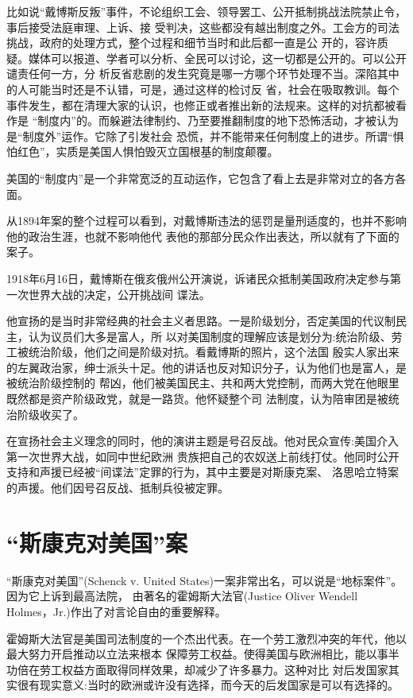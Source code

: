 \documentclass[10pt]{article}
\begin{document}
{比如说``戴博斯反叛''事件，不论组织工会、领导罢工、公开抵制挑战法院禁止令，事后接受法庭审理、上诉、接
受判决，这些都没有越出制度之外。工会方的司法挑战，政府的处理方式，整个过程和细节当时和此后都一直是公
开的，容许质疑。媒体可以报道、学者可以分析、全民可以讨论，这一切都是公开的。可以公开谴责任何一方，分
析反省悲剧的发生究竟是哪一方哪个环节处理不当。深陷其中的人可能当时还是不认错，可是，通过这样的检讨反
省，社会在吸取教训。每个事件发生，都在清理大家的认识，也修正或者推出新的法规来。这样的对抗都被看作是
``制度内''的。而躲避法律制约、乃至要推翻制度的地下恐怖活动，才被认为是``制度外''运作。它除了引发社会
恐慌，并不能带来任何制度上的进步。所谓``惧怕红色''，实质是美国人惧怕毁灭立国根基的制度颠覆。

美国的``制度内''是一个非常宽泛的互动运作，它包含了看上去是非常对立的各方各面。

从1894年案的整个过程可以看到，对戴博斯违法的惩罚是量刑适度的，也并不影响他的政治生涯，也就不影响他代
表他的那部分民众作出表达，所以就有了下面的案子。

1918年6月16日，戴博斯在俄亥俄州公开演说，诉诸民众抵制美国政府决定参与第一次世界大战的决定，公开挑战间
谍法。

他宣扬的是当时非常经典的社会主义者思路。一是阶级划分，否定美国的代议制民主，认为议员们大多是富人，所
以对美国制度的理解应该是划分为:统治阶级、劳工被统治阶级，他们之间是阶级对抗。看戴博斯的照片，这个法国
殷实人家出来的左翼政治家，绅士派头十足。他的讲话也反对知识分子，认为他们也是富人，是被统治阶级控制的
帮凶，他们被美国民主、共和两大党控制，而两大党在他眼里既然都是资产阶级政党，就是一路货。他怀疑整个司
法制度，认为陪审团是被统治阶级收买了。

在宣扬社会主义理念的同时，他的演讲主题是号召反战。他对民众宣传:美国介入第一次世界大战，如同中世纪欧洲
贵族把自己的农奴送上前线打仗。他同时公开支持和声援已经被``间谍法''定罪的行为，其中主要是对斯康克案、
洛思\textperiodcentered 哈立特案的声援。他们因号召反战、抵制兵役被定罪。

\pagebreak
\section{``斯康克对美国''案}

``斯康克对美国''(Schenck v. United States)一案非常出名，可以说是``地标案件''。因为它上诉到最高法院，
由著名的霍姆斯大法官(Justice Oliver Wendell Holmes，Jr.)作出了对言论自由的重要解释。

霍姆斯大法官是美国司法制度的一个杰出代表。在一个劳工激烈冲突的年代，他以最大努力开启推动以立法来根本
保障劳工权益。使得美国与欧洲相比，能以事半功倍在劳工权益方面取得同样效果，却减少了许多暴力。这种对比
対后发国家其实很有现实意义:当时的欧洲或许没有选择，而今天的后发国家是可以有选择的。

}
\end{document}
